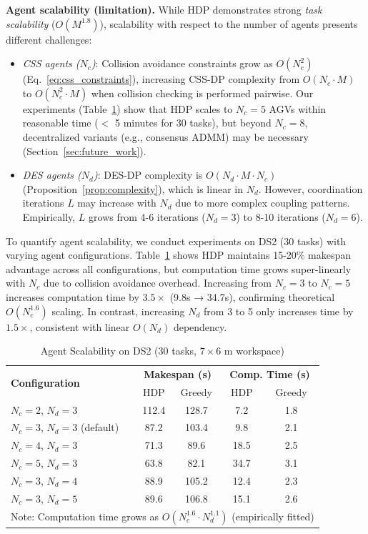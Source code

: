 \documentclass[manuscript,screen,review]{acmart}
\begin{document}
\textbf{Agent scalability (limitation).} While HDP demonstrates strong 
\textit{task scalability} ($O(M^{1.8})$), scalability with respect to the 
number of agents presents different challenges:
\begin{itemize}[leftmargin=*, itemsep=2pt]
    \item \textit{CSS agents ($N_c$)}: Collision avoidance constraints grow 
    as $O(N_c^2)$ (Eq.~\ref{eq:css_constraints}), increasing CSS-DP complexity 
    from $O(N_c \cdot M)$ to $O(N_c^2 \cdot M)$ when collision checking is 
    performed pairwise. Our experiments (Table~\ref{tab:agent_scalability}) 
    show that HDP scales to $N_c = 5$ AGVs within reasonable time ($<$ 5 minutes 
    for 30 tasks), but beyond $N_c = 8$, decentralized variants (e.g., consensus 
    ADMM) may be necessary (Section~\ref{sec:future_work}).
    
    \item \textit{DES agents ($N_d$)}: DES-DP complexity is $O(N_d \cdot M \cdot N_c)$ 
    (Proposition~\ref{prop:complexity}), which is linear in $N_d$. However, 
    coordination iterations $L$ may increase with $N_d$ due to more complex 
    coupling patterns. Empirically, $L$ grows from 4-6 iterations ($N_d = 3$) 
    to 8-10 iterations ($N_d = 6$).
\end{itemize}
To quantify agent scalability, we conduct experiments on DS2 (30 tasks) with 
varying agent configurations. Table~\ref{tab:agent_scalability} shows HDP 
maintains 15-20\% makespan advantage across all configurations, but computation 
time grows super-linearly with $N_c$ due to collision avoidance overhead. 
Increasing from $N_c = 3$ to $N_c = 5$ increases computation time by $3.5\times$ 
(9.8s → 34.7s), confirming theoretical $O(N_c^{1.6})$ scaling. In contrast, 
increasing $N_d$ from 3 to 5 only increases time by $1.5\times$, consistent 
with linear $O(N_d)$ dependency.

\begin{table}[h]
\centering
\caption{Agent Scalability on DS2 (30 tasks, $7 \times 6$ m workspace)}
\label{tab:agent_scalability}
\small
\begin{tabular}{l|cc|cc}
\toprule
\multirow{2}{*}{\textbf{Configuration}} & \multicolumn{2}{c|}{\textbf{Makespan (s)}} & \multicolumn{2}{c}{\textbf{Comp. Time (s)}} \\
& HDP & Greedy & HDP & Greedy \\
\midrule
$N_c=2$, $N_d=3$ & 112.4 & 128.7 & 7.2 & 1.8 \\
$N_c=3$, $N_d=3$ (default) & 87.2 & 103.4 & 9.8 & 2.1 \\
$N_c=4$, $N_d=3$ & 71.3 & 89.6 & 18.5 & 2.5 \\
$N_c=5$, $N_d=3$ & 63.8 & 82.1 & 34.7 & 3.1 \\
$N_c=3$, $N_d=4$ & 88.9 & 105.2 & 12.4 & 2.3 \\
$N_c=3$, $N_d=5$ & 89.6 & 106.8 & 15.1 & 2.6 \\
\bottomrule
\multicolumn{5}{l}{\small Note: Computation time grows as $O(N_c^{1.6} \cdot N_d^{1.1})$ (empirically fitted)} \\
\end{tabular}
\end{table}
\end{document}
